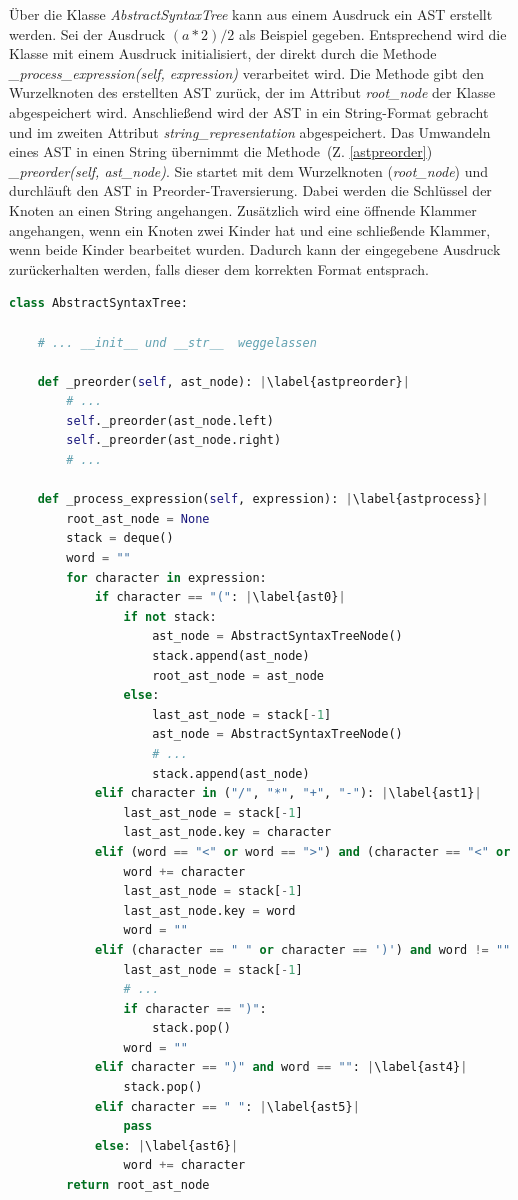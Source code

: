 Über die Klasse \textit{AbstractSyntaxTree} kann aus einem Ausdruck ein AST erstellt werden. Sei der Ausdruck $(a * 2) / 2$ als Beispiel gegeben.
Entsprechend wird die Klasse mit einem Ausdruck initialisiert, der direkt durch die Methode \textit{\_process\_expression(self, expression)} verarbeitet wird.
Die Methode gibt den Wurzelknoten des erstellten AST zurück, der im Attribut \textit{root\_node} der Klasse abgespeichert wird.
Anschließend wird der AST in ein String-Format gebracht und im zweiten Attribut \textit{string\_representation} abgespeichert.
Das Umwandeln eines AST in einen String übernimmt die Methode~(Z. \ref{astpreorder}) \textit{\_preorder(self, ast\_node)}. Sie startet mit dem Wurzelknoten (\textit{root\_node})
und durchläuft den AST in Preorder-Traversierung. Dabei werden die Schlüssel der Knoten an einen String angehangen. Zusätzlich wird eine öffnende Klammer
angehangen, wenn ein Knoten zwei Kinder hat und eine schließende Klammer, wenn beide Kinder bearbeitet wurden. Dadurch kann der eingegebene Ausdruck zurückerhalten werden, falls
dieser dem korrekten Format entsprach.

\begin{lstlisting}[language=Python, escapechar=|, caption=Auszug aus der Klasse \textit{AbstractSyntaxTree}, label={lst:ast}]
class AbstractSyntaxTree:

    # ... __init__ und __str__  weggelassen 

    def _preorder(self, ast_node): |\label{astpreorder}|
        # ...
        self._preorder(ast_node.left)
        self._preorder(ast_node.right)
        # ...

    def _process_expression(self, expression): |\label{astprocess}|
        root_ast_node = None
        stack = deque()
        word = ""
        for character in expression:
            if character == "(": |\label{ast0}|
                if not stack:
                    ast_node = AbstractSyntaxTreeNode()
                    stack.append(ast_node)
                    root_ast_node = ast_node
                else:
                    last_ast_node = stack[-1]
                    ast_node = AbstractSyntaxTreeNode()
                    # ...
                    stack.append(ast_node)
            elif character in ("/", "*", "+", "-"): |\label{ast1}|
                last_ast_node = stack[-1]
                last_ast_node.key = character
            elif (word == "<" or word == ">") and (character == "<" or character == ">"): |\label{ast2}|
                word += character
                last_ast_node = stack[-1]
                last_ast_node.key = word
                word = ""
            elif (character == " " or character == ')') and word != "": |\label{ast3}|
                last_ast_node = stack[-1]
                # ...
                if character == ")":
                    stack.pop()
                word = ""
            elif character == ")" and word == "": |\label{ast4}|
                stack.pop()
            elif character == " ": |\label{ast5}|
                pass
            else: |\label{ast6}|
                word += character
        return root_ast_node
\end{lstlisting}



